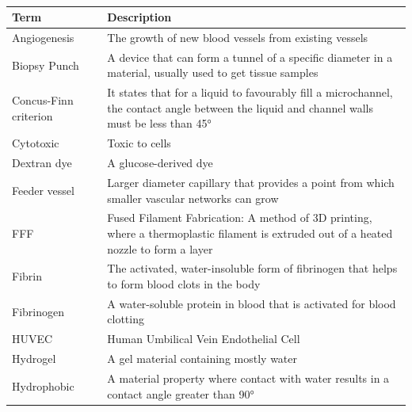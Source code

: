 \documentclass[letterpaper,12pt]{article}
\begin{document}
~
\begin{table}[!h]
\centering

\begin{tabular}{|m{3cm} |m{14cm} |}
\hline
\textbf{Term} & \textbf{Description}\\
\hline
Angiogenesis  & The growth of new blood vessels from existing vessels  \\
\hline
Biopsy Punch  & A device that can form a tunnel of a specific diameter in a material, usually used to get tissue samples  \\
\hline
Concus-Finn criterion  & It states that for a liquid to favourably fill a microchannel, the contact angle between the liquid and channel walls must be less than 45°  \\
\hline
Cytotoxic  & Toxic to cells  \\
\hline
Dextran dye  & A glucose-derived dye  \\
\hline
Feeder vessel  & Larger diameter capillary that provides a point from which smaller vascular networks can grow  \\
\hline
FFF  & Fused Filament Fabrication: A method of 3D printing, where a thermoplastic filament is extruded out of a heated nozzle to form a layer\\
\hline
Fibrin  & The activated, water-insoluble form of fibrinogen that helps to form blood clots in the body  \\
\hline
Fibrinogen  & A water-soluble protein in blood that is activated for blood clotting  \\
\hline
HUVEC  & Human Umbilical Vein Endothelial Cell  \\
\hline
Hydrogel  & A gel material containing mostly water  \\
\hline

Hydrophobic  & A material property where contact with water results in a contact angle greater than 90°  \\



\end{tabular}
\end{table}
\end{document}
